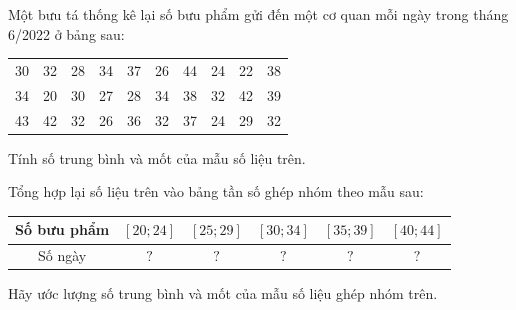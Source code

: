 \begin{ex}%
	Một bưu tá  thống kê lại số bưu phẩm gửi đến một cơ quan mỗi ngày trong tháng 6/2022 ở bảng sau:
	\begin{center}
		\begin{tabular}{*{10}{c}}
			30 &  32 & 28 & 34 & 37 & 26 & 44 & 24 & 22 & 38 \\
			34 & 20 & 30  & 27 & 28 & 34 & 38 & 32 & 42 & 39 \\
			43 & 42 &  32 & 26 & 36 & 32 & 37 & 24 & 29 & 32
		\end{tabular}
	\end{center}
	\begin{listEX}
		\item Tính số trung bình và mốt của mẫu số liệu  trên.
		\item Tổng hợp lại số liệu trên vào bảng tần số  ghép nhóm theo mẫu sau:
		\begin{center}
			\begin{tabular}{|*6{c|}}
				 \hline
				Số bưu phẩm &  $[20; 24]$ &$[25; 29]$ & $[30; 34]$ & $[35; 39]$ & $[40; 44]$ \\
				 \hline
				Số ngày & $?$ & $?$ & $?$ & $?$  & $?$ \\
				 \hline
			\end{tabular}
		\end{center}
		\item Hãy ước lượng số trung bình và mốt của mẫu số liệu ghép  nhóm trên.
	\end{listEX}
\end{ex}

